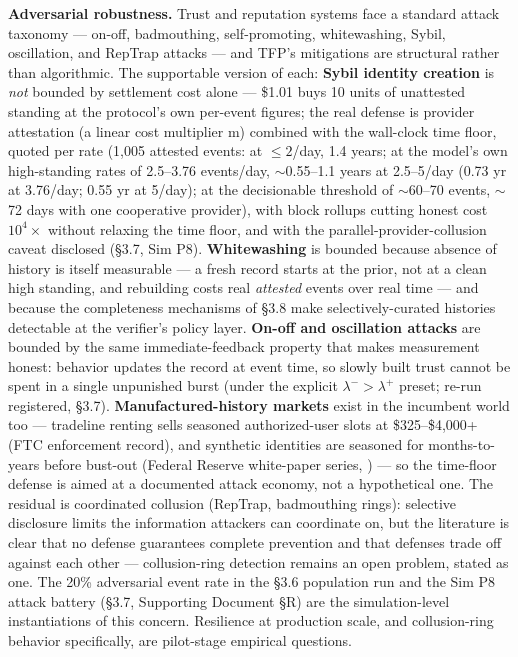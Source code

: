 \documentclass[
]{article}
\begin{document}
\textbf{Adversarial robustness.} Trust and reputation systems face a
standard attack taxonomy --- on-off, badmouthing, self-promoting,
whitewashing, Sybil, oscillation, and RepTrap attacks --- and TFP's
mitigations are structural rather than algorithmic. The supportable
version of each: \textbf{Sybil identity creation} is \emph{not} bounded
by settlement cost alone --- \$1.01 buys 10 units of unattested standing
at the protocol's own per-event figures; the real defense is provider
attestation (a linear cost multiplier m) combined with the wall-clock
time floor, quoted per rate (1,005 attested events: at \(\leq 2\)/day,
1.4 years; at the model's own high-standing rates of 2.5--3.76
events/day, \(\sim\)0.55--1.1 years at 2.5--5/day (0.73 yr at 3.76/day;
0.55 yr at 5/day); at the decisionable threshold of \(\sim\)60--70
events, \(\sim\)72 days with one cooperative provider), with block
rollups cutting honest cost \(10^{4}\times\) without relaxing the time
floor, and with the parallel-provider-collusion caveat disclosed (§3.7,
Sim P8). \textbf{Whitewashing} is bounded because absence of history is
itself measurable --- a fresh record starts at the prior, not at a clean
high standing, and rebuilding costs real \emph{attested} events over
real time --- and because the completeness mechanisms of §3.8 make
selectively-curated histories detectable at the verifier's policy layer.
\textbf{On-off and oscillation attacks} are bounded by the same
immediate-feedback property that makes measurement honest: behavior
updates the record at event time, so slowly built trust cannot be spent
in a single unpunished burst (under the explicit
\(\lambda^{-} > \lambda^{+}\) preset; re-run registered, §3.7).
\textbf{Manufactured-history markets} exist in the incumbent world too
--- tradeline renting sells seasoned authorized-user slots at
\$325--\$4,000+ (FTC enforcement record), and synthetic identities are
seasoned for months-to-years before bust-out (Federal Reserve
white-paper series, ) --- so the time-floor defense is aimed at a
documented attack economy, not a hypothetical one. The residual is
coordinated collusion (RepTrap, badmouthing rings): selective disclosure
limits the information attackers can coordinate on, but the literature
is clear that no defense guarantees complete prevention and that
defenses trade off against each other --- collusion-ring detection
remains an open problem, stated as one. The 20\% adversarial event rate
in the §3.6 population run and the Sim P8 attack battery (§3.7,
Supporting Document §R) are the simulation-level instantiations of this
concern. Resilience at production scale, and collusion-ring behavior
specifically, are pilot-stage empirical questions.
\end{document}
